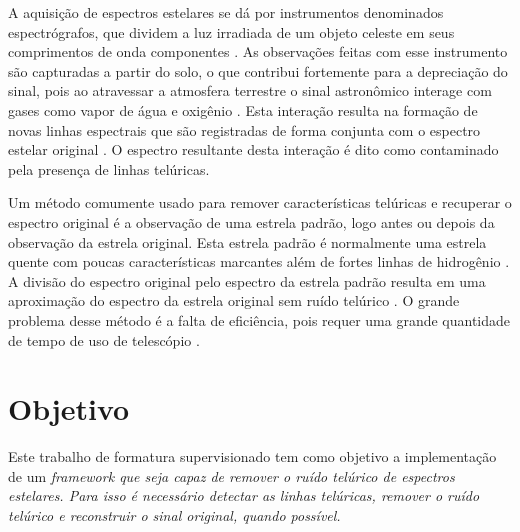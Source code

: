 \documentclass[11pt,twoside,a4paper]{article}
\begin{document}


\par A aquisição de espectros estelares se dá por instrumentos denominados espectrógrafos, que dividem a luz irradiada de um objeto celeste em seus comprimentos de onda componentes \cite{spectrograph_aus}. As observações feitas com esse instrumento são capturadas a partir do solo, o que contribui fortemente para a depreciação do sinal, pois ao atravessar a atmosfera terrestre o sinal astronômico interage com gases como vapor de água e oxigênio \cite{seifahrt2010precise}. Esta interação resulta na formação de novas linhas espectrais que são registradas de forma conjunta com o espectro estelar original \cite{catanzaro1997high}. O espectro resultante desta interação é dito como contaminado pela presença de linhas telúricas. 

\par Um método comumente usado para remover características telúricas e recuperar o espectro original é a observação de uma estrela padrão, logo antes ou depois da observação da estrela original. Esta estrela padrão é normalmente uma estrela quente com poucas características marcantes além de fortes linhas de hidrogênio \cite{seifahrt2010precise}. A divisão do espectro original pelo espectro da estrela padrão resulta em uma aproximação do espectro da estrela original sem ruído telúrico \cite{rudolf2016modelling}. O grande problema desse método é a falta de eficiência, pois requer uma grande quantidade de tempo de uso de telescópio \cite{seifahrt2010precise}.
\section{Objetivo}
\doublespacing
Este trabalho de formatura supervisionado tem como objetivo a implementação  de um \it{framework} que seja capaz de remover o ruído telúrico de espectros estelares. Para isso é necessário detectar as linhas telúricas, remover o ruído telúrico e reconstruir o sinal original, quando possível. 
\end{document}
